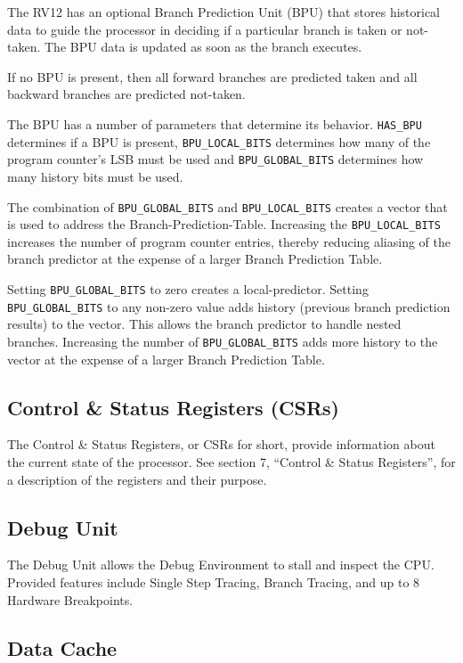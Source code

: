 The RV12 has an optional Branch Prediction Unit (BPU) that stores
historical data to guide the processor in deciding if a particular
branch is taken or not-taken. The BPU data is updated as soon as the
branch executes.

If no BPU is present, then all forward branches are predicted taken and
all backward branches are predicted not-taken.

The BPU has a number of parameters that determine its behavior. \texttt{HAS\_BPU}
determines if a BPU is present, \texttt{BPU\_LOCAL\_BITS} determines how many of
the program counter's LSB must be used and  \texttt{BPU\_GLOBAL\_BITS}  determines
how many history bits must be used.

The combination of \texttt{BPU\_GLOBAL\_BITS} and \texttt{BPU\_LOCAL\_BITS} creates a
vector that is used to address the Branch-Prediction-Table. Increasing
the \texttt{BPU\_LOCAL\_BITS} increases the number of program counter entries,
thereby reducing aliasing of the branch predictor at the expense of a
larger Branch Prediction Table.

Setting \texttt{BPU\_GLOBAL\_BITS} to zero creates a local-predictor. Setting
\texttt{BPU\_GLOBAL\_BITS} to any non-zero value adds history (previous branch
prediction results) to the vector. This allows the branch predictor to
handle nested branches. Increasing the number of \texttt{BPU\_GLOBAL\_BITS} adds
more history to the vector at the expense of a larger Branch Prediction
Table.

\subsection{Control \& Status Registers (CSRs)} \label{control-status-registers-csrs}

The Control \& Status Registers, or CSRs for short, provide information
about the current state of the processor. See section 7, ``Control \&
Status Registers'', for a description of the registers and their
purpose.

\subsection{Debug Unit}\label{debug-unit}

The Debug Unit allows the Debug Environment to stall and inspect the
CPU. Provided features include Single Step Tracing, Branch Tracing, and
up to 8 Hardware Breakpoints.

\subsection{Data Cache}\label{data-cache}

